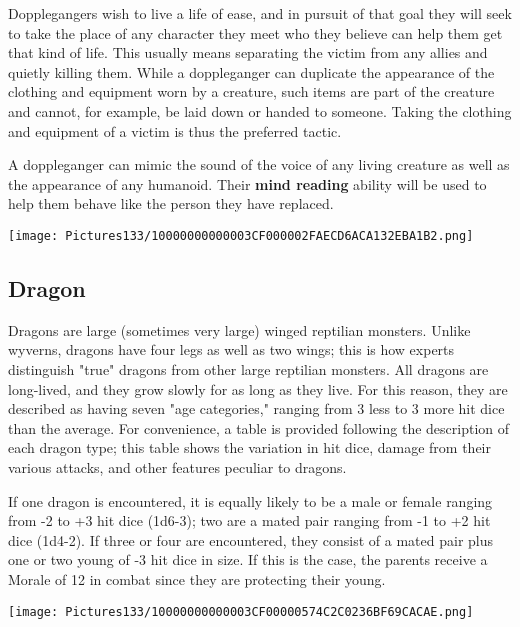 \documentclass[a4paper,twoside,openany,10pt]{book}
\begin{document}
\begin{multicols}{2}
Dopplegangers wish to live a life of ease, and in pursuit of that goal they will seek to take the place of any character they meet who they believe can help them get that kind of life. This usually means separating the victim from any allies and quietly killing them. While a doppleganger can duplicate the appearance of the clothing and equipment worn by a creature, such items are part of the creature and cannot, for example, be laid down or handed to someone. Taking the clothing and equipment of a victim is thus the preferred tactic.

A doppleganger can mimic the sound of the voice of any living creature as well as the appearance of any humanoid. Their \textbf{mind reading} ability will be used to help them behave like the person they have replaced.


\begin{center}
	\texttt{[image: Pictures133/10000000000003CF000002FAECD6ACA132EBA1B2.png]}
\end{center}

\subsection*{Dragon}\label{dragon}

Dragons are large (sometimes very large) winged reptilian monsters. Unlike wyverns, dragons have four legs as well as two wings; this is how experts distinguish "true" dragons from other large reptilian monsters. All dragons are long-lived, and they grow slowly for as long as they live. For this reason, they are described as having seven "age categories," ranging from 3 less to 3 more hit dice than the average. For convenience, a table is provided following the description of each dragon type; this table shows the variation in hit dice, damage from their various attacks, and other features peculiar to dragons. 

If one dragon is encountered, it is equally likely to be a male or female ranging from -2 to +3 hit dice (1d6-3); two are a mated pair ranging from -1 to +2 hit dice (1d4-2). If three or four are encountered, they consist of a mated pair plus one or two young of -3 hit dice in size. If this is the case, the parents receive a Morale of 12 in combat since they are protecting their young.


\begin{center}
	\texttt{[image: Pictures133/10000000000003CF00000574C2C0236BF69CACAE.png]}
\end{center}


\end{multicols}
\end{document}
